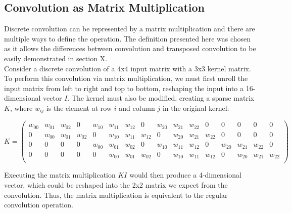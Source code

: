 \subsection{Convolution as Matrix Multiplication} \label{conv-matrix}
 
Discrete convolution can be represented by a matrix multiplication and there are multiple ways to define the operation. The definition presented here was chosen as it allows the differences between convolution and transposed convolution to be easily demonstrated in section X. \\

\noindent Consider a discrete convolution of a 4x4 input matrix with a 3x3 kernel matrix. To perform this convolution via matrix multiplication, we must first unroll the input matrix from left to right and top to bottom, reshaping the input into a 16-dimensional vector $I$. The kernel must also be modified, creating a sparse matrix $K$, where $w_{ij}$ is the element at row $i$ and column $j$ in the original kernel:

\[
    K = 
    \left(
    \begin{smallmatrix}
    \textit{$w_{00}$} & \textit{$w_{01}$} & \textit{$w_{02}$} & 0 & \textit{$w_{10}$} & \textit{$w_{11}$} & \textit{$w_{12}$} & 0 & \textit{$w_{20}$} & \textit{$w_{21}$} & \textit{$w_{22}$} & 0 & 0 & 0 & 0 & 0 \\
    0 & \textit{$w_{00}$} & \textit{$w_{01}$} & \textit{$w_{02}$} & 0 & \textit{$w_{10}$} & \textit{$w_{11}$} & \textit{$w_{12}$} & 0 & \textit{$w_{20}$} & \textit{$w_{21}$} & \textit{$w_{22}$} & 0 & 0 & 0 & 0 \\
    0 & 0 & 0 & 0 & \textit{$w_{00}$} & \textit{$w_{01}$} & \textit{$w_{02}$} & 0 & \textit{$w_{10}$} & \textit{$w_{11}$} & \textit{$w_{12}$} & 0 & \textit{$w_{20}$} & \textit{$w_{21}$} & \textit{$w_{22}$} & 0 \\
    0 & 0 & 0 & 0 & 0 & \textit{$w_{00}$} & \textit{$w_{01}$} & \textit{$w_{02}$} & 0 & \textit{$w_{10}$} & \textit{$w_{11}$} & \textit{$w_{12}$} & 0 & \textit{$w_{20}$} & \textit{$w_{21}$} & \textit{$w_{22}$} \\
    \end{smallmatrix}
    \right)
\]

\noindent Executing the matrix multiplication $KI$ would then produce a 4-dimensional vector, which could be reshaped into the 2x2 matrix we expect from the convolution. Thus, the matrix multiplication is equivalent to the regular convolution operation.

